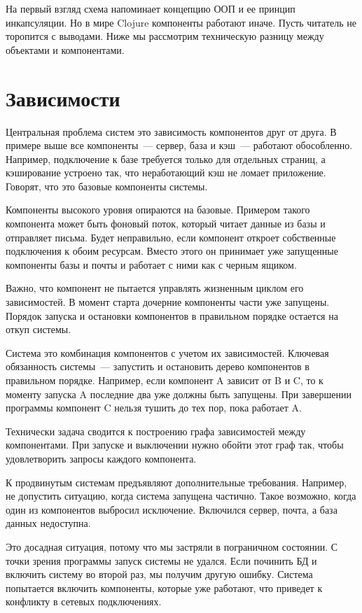 На первый взгляд схема напоминает концепцию ООП и ее принцип инкапсуляции. Но в
мире Clojure компоненты работают иначе. Пусть читатель не торопится с
выводами. Ниже мы рассмотрим техническую разницу между объектами и компонентами.

\section{Зависимости}

Центральная проблема систем это зависимость компонентов друг от друга. В примере
выше все компоненты~--- сервер, база и кэш~--- работают обособленно. Например,
подключение к базе требуется только для отдельных страниц, а кэширование
устроено так, что неработающий кэш не ломает приложение. Говорят, что это
базовые компоненты системы.

Компоненты высокого уровня опираются на базовые. Примером такого компонента
может быть фоновый поток, который читает данные из базы и отправляет
письма. Будет неправильно, если компонент откроет собственные подключения к
обоим ресурсам. Вместо этого он принимает уже запущенные компоненты базы и почты
и работает с ними как с черным ящиком.

Важно, что компонент не пытается управлять жизненным циклом его зависимостей. В
момент старта дочерние компоненты части уже запущены. Порядок запуска и
остановки компонентов в правильном порядке остается на откуп системы.

Система это комбинация компонентов с учетом их зависимостей. Ключевая
обязанность системы~--- запустить и остановить дерево компонентов в правильном
порядке. Например, если компонент A зависит от B и C, то к моменту запуска A
последние два уже должны быть запущены. При завершении программы компонент C
нельзя тушить до тех пор, пока работает A.

Технически задача сводится к построению графа зависимостей между
компонентами. При запуске и выключении нужно обойти этот граф так, чтобы
удовлетворить запросы каждого компонента.

К продвинутым системам предъявляют дополнительные требования. Например, не
допустить ситуацию, когда система запущена частично. Такое возможно, когда один
из компонентов выбросил исключение. Включился сервер, почта, а база данных
недоступна.

Это досадная ситуация, потому что мы застряли в пограничном состоянии. С точки
зрения программы запуск системы не удался. Если починить БД и включить систему
во второй раз, мы получим другую ошибку. Система попытается включить компоненты,
которые уже работают, что приведет к конфликту в сетевых подключениях.

